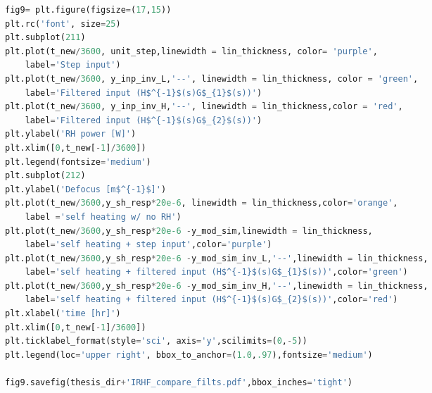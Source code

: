 \begin{spacing}{1.2} \begin{lstlisting}[frame=single,language=Python]
fig9= plt.figure(figsize=(17,15))
plt.rc('font', size=25)
plt.subplot(211)
plt.plot(t_new/3600, unit_step,linewidth = lin_thickness, color= 'purple', 
    label='Step input')
plt.plot(t_new/3600, y_inp_inv_L,'--', linewidth = lin_thickness, color = 'green',
    label='Filtered input (H$^{-1}$(s)G$_{1}$(s))')
plt.plot(t_new/3600, y_inp_inv_H,'--', linewidth = lin_thickness,color = 'red', 
    label='Filtered input (H$^{-1}$(s)G$_{2}$(s))')
plt.ylabel('RH power [W]')
plt.xlim([0,t_new[-1]/3600])
plt.legend(fontsize='medium')
plt.subplot(212)
plt.ylabel('Defocus [m$^{-1}$]')
plt.plot(t_new/3600,y_sh_resp*20e-6, linewidth = lin_thickness,color='orange',
    label ='self heating w/ no RH')
plt.plot(t_new/3600,y_sh_resp*20e-6 -y_mod_sim,linewidth = lin_thickness,
    label='self heating + step input',color='purple')
plt.plot(t_new/3600,y_sh_resp*20e-6 -y_mod_sim_inv_L,'--',linewidth = lin_thickness,
    label='self heating + filtered input (H$^{-1}$(s)G$_{1}$(s))',color='green')
plt.plot(t_new/3600,y_sh_resp*20e-6 -y_mod_sim_inv_H,'--',linewidth = lin_thickness,
    label='self heating + filtered input (H$^{-1}$(s)G$_{2}$(s))',color='red')
plt.xlabel('time [hr]')
plt.xlim([0,t_new[-1]/3600])
plt.ticklabel_format(style='sci', axis='y',scilimits=(0,-5))
plt.legend(loc='upper right', bbox_to_anchor=(1.0,.97),fontsize='medium')

fig9.savefig(thesis_dir+'IRHF_compare_filts.pdf',bbox_inches='tight')
\end{lstlisting} \end{spacing}


